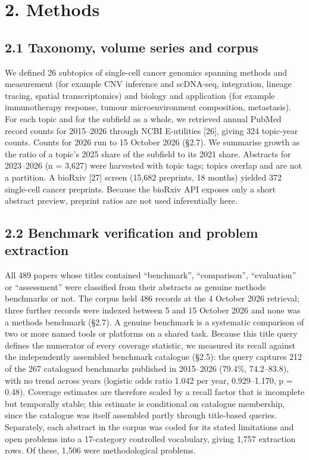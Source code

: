 \documentclass{article}
\begin{document}
\section{2. Methods}\label{methods}

\subsection{2.1 Taxonomy, volume series and corpus}\label{taxonomy-volume-series-and-corpus}

We defined 26 subtopics of single-cell cancer genomics spanning methods
and measurement (for example CNV inference and scDNA-seq, integration,
lineage tracing, spatial transcriptomics) and biology and application
(for example immunotherapy response, tumour microenvironment
composition, metastasis). For each topic and for the subfield as a
whole, we retrieved annual PubMed record counts for 2015--2026 through
NCBI E-utilities {[}26{]}, giving 324 topic-year counts. Counts for 2026
run to 15 October 2026 (§2.7). We summarise growth as the ratio of a
topic's 2025 share of the subfield to its 2021 share. Abstracts for
2023--2026 (n = 3,627) were harvested with topic tags; topics overlap
and are not a partition. A bioRxiv {[}27{]} screen (15,682 preprints, 18
months) yielded 372 single-cell cancer preprints. Because the bioRxiv
API exposes only a short abstract preview, preprint ratios are not used
inferentially here.

\subsection{2.2 Benchmark verification and problem extraction}\label{benchmark-verification-and-problem-extraction}

All 489 papers whose titles contained ``benchmark'', ``comparison'',
``evaluation'' or ``assessment'' were classified from their abstracts as
genuine methods benchmarks or not. The corpus held 486 records at the 4
October 2026 retrieval; three further records were indexed between 5 and
15 October 2026 and none was a methods benchmark (§2.7). A genuine
benchmark is a systematic comparison of two or more named tools or
platforms on a shared task. Because this title query defines the
numerator of every coverage statistic, we measured its recall against
the independently assembled benchmark catalogue (§2.5): the query
captures 212 of the 267 catalogued benchmarks published in 2015--2026
(79.4\%, 74.2--83.8), with no trend across years (logistic odds ratio
1.042 per year, 0.929--1.170, p = 0.48). Coverage estimates are
therefore scaled by a recall factor that is incomplete but temporally
stable; this estimate is conditional on catalogue membership, since the
catalogue was itself assembled partly through title-based queries.
Separately, each abstract in the corpus was coded for its stated
limitations and open problems into a 17-category controlled vocabulary,
giving 1,757 extraction rows. Of these, 1,506 were methodological
problems.
\end{document}
